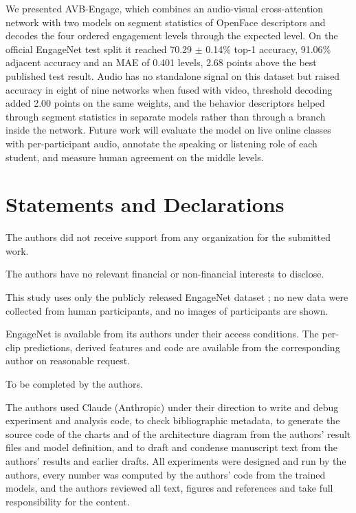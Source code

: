 \documentclass[pdflatex,iicol,sn-basic]{sn-jnl}
\newcommand{\ournet}{AVB-Engage}
\begin{document}
We presented \ournet, which combines an audio-visual cross-attention network with two models on segment statistics of OpenFace descriptors and decodes the four ordered engagement levels through the expected level. On the official EngageNet test split it reached 70.29 $\pm$ 0.14\% top-1 accuracy, 91.06\% adjacent accuracy and an MAE of 0.401 levels, 2.68 points above the best published test result. Audio has no standalone signal on this dataset but raised accuracy in eight of nine networks when fused with video, threshold decoding added 2.00 points on the same weights, and the behavior descriptors helped through segment statistics in separate models rather than through a branch inside the network. Future work will evaluate the model on live online classes with per-participant audio, annotate the speaking or listening role of each student, and measure human agreement on the middle levels.

\backmatter

\section*{Statements and Declarations}

The authors did not receive support from any organization for the submitted work.

The authors have no relevant financial or non-financial interests to disclose.

This study uses only the publicly released EngageNet dataset \citep{singh2023engagenet}; no new data were collected from human participants, and no images of participants are shown. %

EngageNet is available from its authors under their access conditions. The per-clip predictions, derived features and code are available from the corresponding author on reasonable request. %

To be completed by the authors.

The authors used Claude (Anthropic) under their direction to write and debug experiment and analysis code, to check bibliographic metadata, to generate the source code of the charts and of the architecture diagram from the authors' result files and model definition, and to draft and condense manuscript text from the authors' results and earlier drafts. All experiments were designed and run by the authors, every number was computed by the authors' code from the trained models, and the authors reviewed all text, figures and references and take full responsibility for the content.


\end{document}
